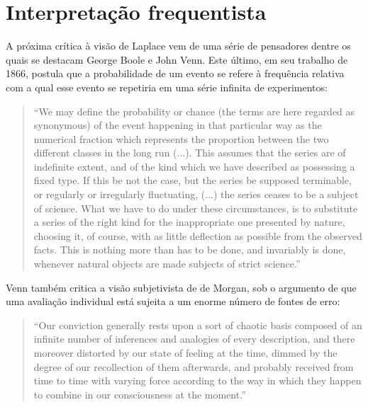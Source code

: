 \section{Interpretação frequentista}
A próxima crítica à visão de Laplace 
vem de uma série de pensadores dentre os quais se destacam George Boole e John Venn.
Este último, em seu trabalho de 
1866, postula que a probabilidade de um evento se refere à
 frequência relativa com a qual esse evento se repetiria em uma
série infinita de experimentos:

\begin{quote}
``We may define the probability or chance (the terms are here regarded as synonymous) of the event happening in that
particular way as the numerical fraction which represents the proportion between the two different classes in the long run (...).
This assumes that the series are of indefinite extent, and of the kind which we have described as possessing a fixed type.
If this be not the case, but the series be supposed terminable, or regularly or irregularly fluctuating, (...) the series ceases
to be a subject of science. What we have to do under these circumstances, is to substitute a series of the right kind for
the inappropriate one presented by nature, choosing it, of course, with as little deflection as possible from the observed facts.
This is nothing more than has to be done, and invariably is done, whenever natural objects are made subjects of strict science.''
\citep{Venn1866}
\end{quote}

Venn também critica a visão subjetivista de de Morgan, sob
o argumento de que uma avaliação individual está sujeita a
um enorme número de fontes de erro:

\begin{quote}
``Our conviction generally rests upon a sort of chaotic basis
composed of an infinite number of inferences and analogies
of every description, and there moreover distorted by our
state of feeling at the time, dimmed by the degree of our
recollection of them afterwards, and probably received
from time to time with varying force according to the way in
which they happen to combine in our consciousness at the 
moment.''\citep{Venn1866}
\end{quote}

